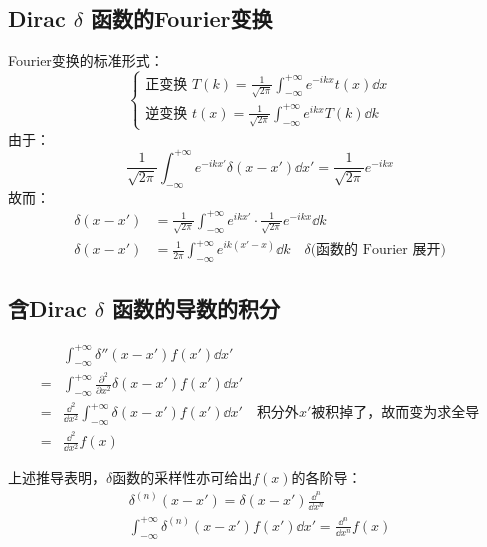 \subsection{Dirac \texorpdfstring{$\delta$}{delta} 函数的Fourier变换}
Fourier变换的标准形式：
$$\begin{cases} 
\text{正变换 } T(k) = \frac{1}{\sqrt{2\pi}} \int_{-\infty}^{+\infty} e^{-ikx} t(x) \dd{x} \\
\text{逆变换 } t(x) = \frac{1}{\sqrt{2\pi}} \int_{-\infty}^{+\infty} e^{ikx} T(k) \dd{k}
\end{cases}$$
由于：
$$\frac{1}{\sqrt{2\pi}} \int_{-\infty}^{+\infty} e^{-ikx'} \delta(x - x') \dd{x'} = \frac{1}{\sqrt{2\pi}} e^{-ikx}$$
故而：
\begin{align*}
    \delta(x - x') &= \frac{1}{\sqrt{2\pi}} \int_{-\infty}^{+\infty} e^{ikx'} \cdot \frac{1}{\sqrt{2\pi}} e^{-ikx} \dd{k} \\
    \delta(x - x') &= \frac{1}{2\pi} \int_{-\infty}^{+\infty} e^{ik(x' - x)} \dd{k} \quad \delta \text{(函数的 Fourier 展开)}
\end{align*}

\subsection{含Dirac \texorpdfstring{$\delta$}{delta} 函数的导数的积分}
\begin{derivation}
    $$\begin{aligned}
        & \int_{-\infty}^{+\infty} \delta''(x - x') f(x') \dd{x'} \\
        = & \int_{-\infty}^{+\infty} \frac{\partial^2}{\partial x^2} \delta(x - x') f(x') \dd{x'} \\
        = & \frac{\dd^2}{\dd{x^2}} \int_{-\infty}^{+\infty} \delta(x - x') f(x') \dd{x'} \quad \text{积分外} x' \text{被积掉了，故而变为求全导} \\
        = & \frac{\dd^2}{\dd{x^2}} f(x)
    \end{aligned}$$
\end{derivation}

上述推导表明，$\delta$函数的采样性亦可给出$f(x)$的各阶导：
\begin{gather*}
\delta^{(n)}(x - x') = \delta(x - x') \frac{\dd^n}{\dd{x^n}} \\
\int_{-\infty}^{+\infty} \delta^{(n)}(x - x') f(x') \dd{x'} = \frac{\dd^n}{\dd{x^n}} f(x)
\end{gather*}

